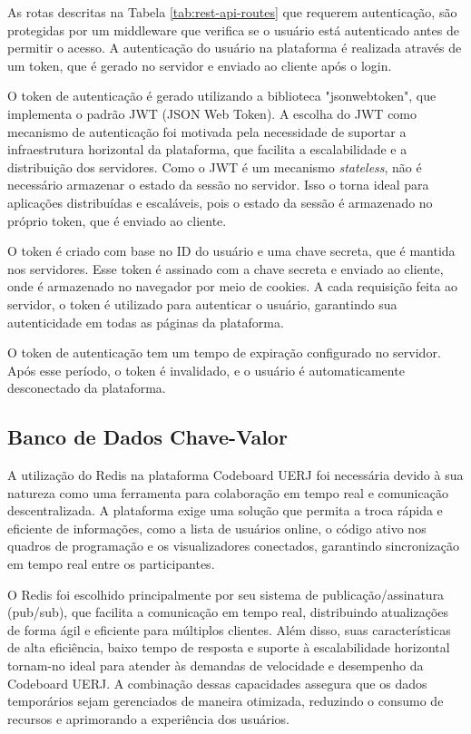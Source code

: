 As rotas descritas na Tabela \ref{tab:rest-api-routes} que requerem autenticação, são protegidas por um middleware que verifica se o usuário está autenticado antes de permitir o acesso. A autenticação do usuário na plataforma é realizada através de um token, que é gerado no servidor e enviado ao cliente após o login. 

O token de autenticação é gerado utilizando a biblioteca "jsonwebtoken", que implementa o padrão JWT (JSON Web Token). A escolha do JWT como mecanismo de autenticação foi motivada pela necessidade de suportar a infraestrutura horizontal da plataforma, que facilita a escalabilidade e a distribuição dos servidores. Como o JWT é um mecanismo \emph{stateless}, não é necessário armazenar o estado da sessão no servidor. Isso o torna ideal para aplicações distribuídas e escaláveis, pois o estado da sessão é armazenado no próprio token, que é enviado ao cliente.

O token é criado com base no ID do usuário e uma chave secreta, que é mantida nos servidores. Esse token é assinado com a chave secreta e enviado ao cliente, onde é armazenado no navegador por meio de cookies. A cada requisição feita ao servidor, o token é utilizado para autenticar o usuário, garantindo sua autenticidade em todas as páginas da plataforma.

O token de autenticação tem um tempo de expiração configurado no servidor. Após esse período, o token é invalidado, e o usuário é automaticamente desconectado da plataforma.


\subsection{Banco de Dados Chave-Valor}

A utilização do Redis na plataforma Codeboard UERJ foi necessária devido à sua natureza como uma ferramenta para colaboração em tempo real e comunicação descentralizada. A plataforma exige uma solução que permita a troca rápida e eficiente de informações, como a lista de usuários online, o código ativo nos quadros de programação e os visualizadores conectados, garantindo sincronização em tempo real entre os participantes.

O Redis foi escolhido principalmente por seu sistema de publicação/assinatura (pub/sub), que facilita a comunicação em tempo real, distribuindo atualizações de forma ágil e eficiente para múltiplos clientes. Além disso, suas características de alta eficiência, baixo tempo de resposta e suporte à escalabilidade horizontal tornam-no ideal para atender às demandas de velocidade e desempenho da Codeboard UERJ. A combinação dessas capacidades assegura que os dados temporários sejam gerenciados de maneira otimizada, reduzindo o consumo de recursos e aprimorando a experiência dos usuários.

